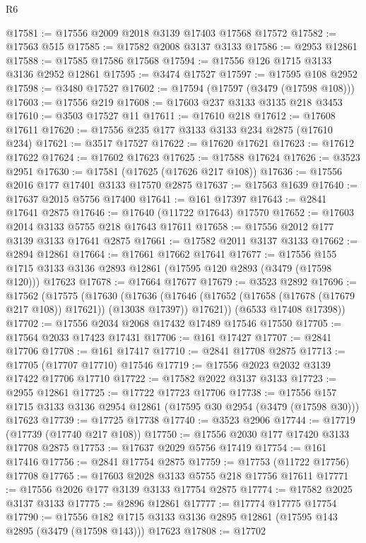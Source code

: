 \begin{lexlean}{R6}
\begin{coremodule}
@17581 := @17556 @2009 @2018 @3139 @17403 @17568 @17572
@17582 := @17563 @515
@17585 := @17582 @2008 @3137 @3133
@17586 := @2953 @12861
@17588 := @17585 @17586 @17568
@17594 := @17556 @126 @1715 @3133 @3136 @2952 @12861
@17595 := @3474 @17527
@17597 := @17595 @108 @2952
@17598 := @3480 @17527
@17602 := @17594 (@17597 (@3479 (@17598 @108)))
@17603 := @17556 @219
@17608 := @17603 @237 @3133 @3135 @218 @3453
@17610 := @3503 @17527 @11
@17611 := @17610 @218
@17612 := @17608 @17611
@17620 := @17556 @235 @177 @3133 @3133 @234 @2875 (@17610 @234)
@17621 := @3517 @17527
@17622 := @17620 @17621
@17623 := @17612 @17622
@17624 := @17602 @17623
@17625 := @17588 @17624
@17626 := @3523 @2951
@17630 := @17581 (@17625 (@17626 @217 @108))
@17636 := @17556 @2016 @177 @17401 @3133 @17570 @2875
@17637 := @17563 @1639
@17640 := @17637 @2015 @5756 @17400
@17641 := @161 @17397
@17643 := @2841 @17641 @2875
@17646 := @17640 (@11722 @17643) @17570
@17652 := @17603 @2014 @3133 @5755 @218 @17643 @17611
@17658 := @17556 @2012 @177 @3139 @3133 @17641 @2875
@17661 := @17582 @2011 @3137 @3133
@17662 := @2894 @12861
@17664 := @17661 @17662 @17641
@17677 := @17556
    @155
    @1715
    @3133
    @3136
    @2893
    @12861
    (@17595 @120 @2893 (@3479 (@17598 @120)))
    @17623
@17678 := @17664 @17677
@17679 := @3523 @2892
@17696 := @17562
    (@17575
      (@17630
        (@17636
          (@17646 (@17652 (@17658 (@17678 (@17679 @217 @108)) @17621)) (@13038 @17397))
          @17621))
      (@6533 @17408 @17398))
@17702 := @17556 @2034 @2068 @17432 @17489 @17546 @17550
@17705 := @17564 @2033 @17423 @17431
@17706 := @161 @17427
@17707 := @2841 @17706
@17708 := @161 @17417
@17710 := @2841 @17708 @2875
@17713 := @17705 (@17707 @17710) @17546
@17719 := @17556 @2023 @2032 @3139 @17422 @17706 @17710
@17722 := @17582 @2022 @3137 @3133
@17723 := @2955 @12861
@17725 := @17722 @17723 @17706
@17738 := @17556 @157 @1715 @3133 @3136 @2954 @12861 (@17595 @30 @2954 (@3479 (@17598 @30))) @17623
@17739 := @17725 @17738
@17740 := @3523 @2906
@17744 := @17719 (@17739 (@17740 @217 @108))
@17750 := @17556 @2030 @177 @17420 @3133 @17708 @2875
@17753 := @17637 @2029 @5756 @17419
@17754 := @161 @17416
@17756 := @2841 @17754 @2875
@17759 := @17753 (@11722 @17756) @17708
@17765 := @17603 @2028 @3133 @5755 @218 @17756 @17611
@17771 := @17556 @2026 @177 @3139 @3133 @17754 @2875
@17774 := @17582 @2025 @3137 @3133
@17775 := @2896 @12861
@17777 := @17774 @17775 @17754
@17790 := @17556
    @182
    @1715
    @3133
    @3136
    @2895
    @12861
    (@17595 @143 @2895 (@3479 (@17598 @143)))
    @17623
@17808 := @17702

\end{coremodule}
\end{lexlean}
